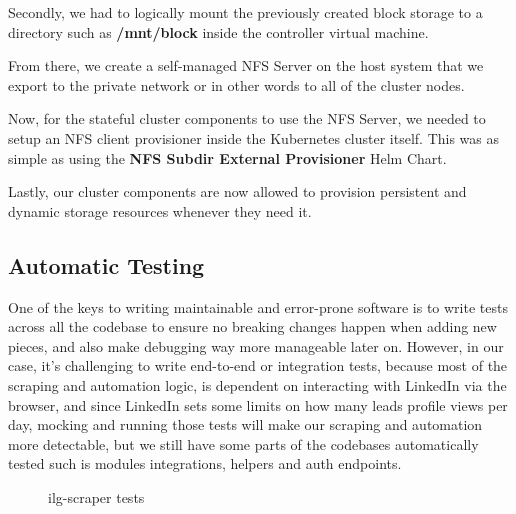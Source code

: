 \newpage

Secondly, we had to logically mount the previously created block storage to a directory such as \textbf{/mnt/block} inside the controller virtual machine.

From there, we create a self-managed NFS Server on the host system that we export to the private network or in other words to all of the cluster nodes.

Now, for the stateful cluster components to use the NFS Server, we needed to setup an NFS client provisioner inside the Kubernetes cluster itself. This was as simple as using the \textbf{NFS Subdir External Provisioner} Helm Chart.

Lastly, our cluster components are now allowed to provision persistent and dynamic storage resources whenever they need it.

\subsection{Automatic Testing}
One of the keys to writing maintainable and error-prone software is to write tests across all the codebase to ensure no breaking changes happen when adding new pieces, and also make debugging way more manageable later on. However, in our case, it's challenging to write end-to-end or integration tests, because most of the scraping and automation logic, is dependent on interacting with LinkedIn via the browser, and since LinkedIn sets some limits on how many leads profile views per day, mocking and running those tests will make our scraping and automation more detectable, but we still have some parts of the codebases automatically tested such is modules integrations, helpers and auth endpoints. 

\begin{figure}[H]
    \centering
    \caption{ilg-scraper tests}
    \label{fig:ilg-scraper-tests}
\end{figure}

